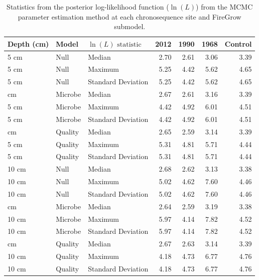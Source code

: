 \begin{table}

\caption{\label{tab:ll_stats}Statistics from the posterior log-likelihood function ($\ln(L)$) from the MCMC parameter estimation method at each chronosequence site and FireGrow submodel.}
\centering
\begin{tabular}[t]{lllrrrr}
\toprule
Depth (cm) & Model & $\ln(L)\text{ statistic}$ & 2012 & 1990 & 1968 & Control\\
\midrule
5 cm & Null & Median & 2.70 & 2.61 & 3.06 & 3.39\\
5 cm & Null & Maximum & 5.25 & 4.42 & 5.62 & 4.65\\
5 cm & Null & Standard Deviation & 5.25 & 4.42 & 5.62 & 4.65\\
\addlinespace
5 cm & Microbe & Median & 2.67 & 2.61 & 3.16 & 3.39\\
5 cm & Microbe & Maximum & 4.42 & 4.92 & 6.01 & 4.51\\
5 cm & Microbe & Standard Deviation & 4.42 & 4.92 & 6.01 & 4.51\\
\addlinespace
5 cm & Quality & Median & 2.65 & 2.59 & 3.14 & 3.39\\
5 cm & Quality & Maximum & 5.31 & 4.81 & 5.71 & 4.44\\
5 cm & Quality & Standard Deviation & 5.31 & 4.81 & 5.71 & 4.44\\ \hline
10 cm & Null & Median & 2.68 & 2.62 & 3.13 & 3.38\\
10 cm & Null & Maximum & 5.02 & 4.62 & 7.60 & 4.46\\
10 cm & Null & Standard Deviation & 5.02 & 4.62 & 7.60 & 4.46\\
\addlinespace
10 cm & Microbe & Median & 2.64 & 2.59 & 3.19 & 3.38\\
10 cm & Microbe & Maximum & 5.97 & 4.14 & 7.82 & 4.52\\
10 cm & Microbe & Standard Deviation & 5.97 & 4.14 & 7.82 & 4.52\\
\addlinespace
10 cm & Quality & Median & 2.67 & 2.63 & 3.14 & 3.39\\
10 cm & Quality & Maximum & 4.18 & 4.73 & 6.77 & 4.76\\
10 cm & Quality & Standard Deviation & 4.18 & 4.73 & 6.77 & 4.76\\
\bottomrule
\end{tabular}
\end{table}
